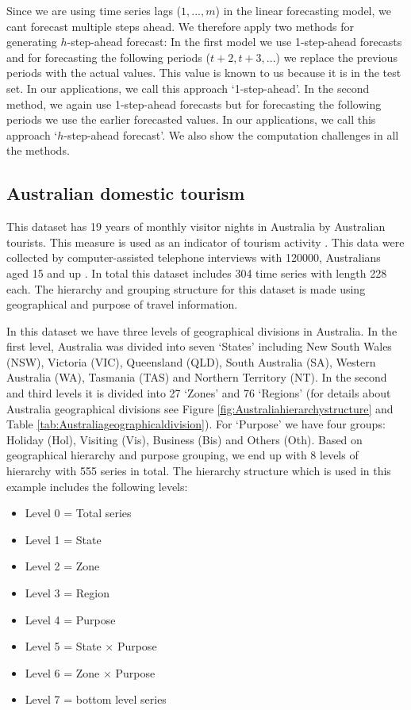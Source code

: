 \documentclass[11pt,a4paper,]{article}
\providecommand{\tightlist}{%
  \setlength{\itemsep}{0pt}\setlength{\parskip}{0pt}}
\begin{document}
Since we are using time series lags (\(1, ..., m\)) in the linear
forecasting model, we cant forecast multiple steps ahead. We therefore
apply two methods for generating \(h\)-step-ahead forecast: In the first
model we use 1-step-ahead forecasts and for forecasting the following
periods (\(t+2,t+3,...\)) we replace the previous periods with the
actual values. This value is known to us because it is in the test set.
In our applications, we call this approach `1-step-ahead'. In the second
method, we again use 1-step-ahead forecasts but for forecasting the
following periods we use the earlier forecasted values. In our
applications, we call this approach `\(h\)-step-ahead forecast'. We also
show the computation challenges in all the methods.

\subsection{Australian domestic
tourism}\label{australian-domestic-tourism}

This dataset has 19 years of monthly visitor nights in Australia by
Australian tourists. This measure is used as an indicator of tourism
activity \autocite{wickramasuriya2018optimal}. This data were collected
by computer-assisted telephone interviews with 120000, Australians aged
15 and up \autocite[Research tourism][]{researchAustralia2005}. In total
this dataset includes 304 time series with length 228 each. The
hierarchy and grouping structure for this dataset is made using
geographical and purpose of travel information.

In this dataset we have three levels of geographical divisions in
Australia. In the first level, Australia was divided into seven `States'
including New South Wales (NSW), Victoria (VIC), Queensland (QLD), South
Australia (SA), Western Australia (WA), Tasmania (TAS) and Northern
Territory (NT). In the second and third levels it is divided into 27
`Zones' and 76 `Regions' (for details about Australia geographical
divisions see Figure \ref{fig:Australiahierarchystructure} and Table
\ref{tab:Australiageographicaldivision}). For `Purpose' we have four
groups: Holiday (Hol), Visiting (Vis), Business (Bis) and Others (Oth).
Based on geographical hierarchy and purpose grouping, we end up with 8
levels of hierarchy with 555 series in total. The hierarchy structure
which is used in this example includes the following levels:

\begin{itemize}
\tightlist
\item
  Level 0 = Total series
\item
  Level 1 = State
\item
  Level 2 = Zone
\item
  Level 3 = Region
\item
  Level 4 = Purpose
\item
  Level 5 = State \(\times\) Purpose
\item
  Level 6 = Zone \(\times\) Purpose
\item
  Level 7 = bottom level series
\end{itemize}
\end{document}
